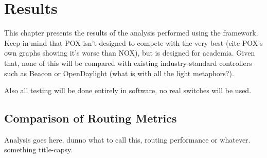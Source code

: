 \chapter{Results}

This chapter presents the results of the analysis performed using the framework. Keep in mind that POX isn't designed to compete with the very best (cite POX's own graphs showing it's worse than NOX), but is designed for academia. Given that, none of this will be compared with existing industry-standard controllers such as Beacon or OpenDaylight (what is with all the light metaphors?).

Also all testing will be done entirely in software, no real switches will be used.

\section{Comparison of Routing Metrics}
Analysis goes here. dunno what to call this, routing performance or whatever. something title-capsy.

